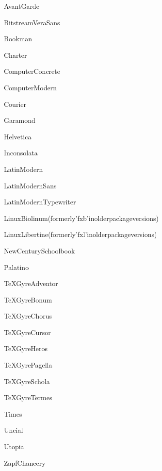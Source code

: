 \documentclass[18pt,A4]{article}
\begin{document}
{\selectfont AvantGarde}

{\selectfont BitstreamVeraSans}

{\selectfont Bookman}

{\selectfont Charter}

{\selectfont ComputerConcrete}

{\selectfont ComputerModern}

{\selectfont Courier}

{\selectfont Garamond}

{\selectfont Helvetica}

{\selectfont Inconsolata}

{\selectfont LatinModern}

{\selectfont LatinModernSans}

{\selectfont LatinModernTypewriter}

{\selectfont LinuxBiolinum(formerly'fxb'inolderpackageversions)}

{\selectfont LinuxLibertine(formerly'fxl'inolderpackageversions)}

{\selectfont NewCenturySchoolbook}

{\selectfont Palatino}

{\selectfont TeXGyreAdventor}

{\selectfont TeXGyreBonum}

{\selectfont TeXGyreChorus}

{\selectfont TeXGyreCursor}

{\selectfont TeXGyreHeros}

{\selectfont TeXGyrePagella}

{\selectfont TeXGyreSchola}

{\selectfont TeXGyreTermes}

{\selectfont Times}

{\selectfont Uncial}

{\selectfont Utopia}

{\selectfont ZapfChancery}
\end{document}
